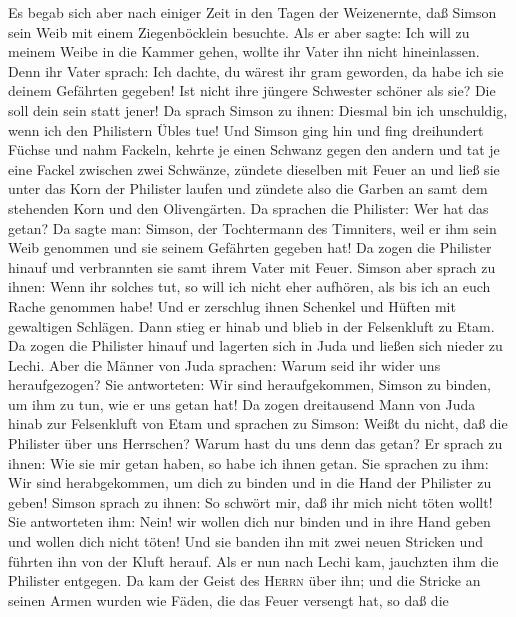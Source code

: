  Es begab sich aber nach einiger Zeit in den Tagen der
Weizenernte, daß Simson sein Weib mit einem Ziegenböcklein besuchte. Als
er aber sagte: Ich will zu meinem Weibe in die Kammer gehen, wollte ihr
Vater ihn nicht hineinlassen.  Denn ihr Vater sprach: Ich
dachte, du wärest ihr gram geworden, da habe ich sie deinem Gefährten
gegeben! Ist nicht ihre jüngere Schwester schöner als sie? Die soll dein
sein statt jener!  Da sprach Simson zu ihnen: Diesmal bin
ich unschuldig, wenn ich den Philistern Übles tue!  Und
Simson ging hin und fing dreihundert Füchse und nahm Fackeln, kehrte je
einen Schwanz gegen den andern und tat je eine Fackel zwischen zwei
Schwänze,  zündete dieselben mit Feuer an und ließ sie
unter das Korn der Philister laufen und zündete also die Garben an samt
dem stehenden Korn und den Olivengärten.  Da sprachen die
Philister: Wer hat das getan? Da sagte man: Simson, der Tochtermann des
Timniters, weil er ihm sein Weib genommen und sie seinem Gefährten
gegeben hat! Da zogen die Philister hinauf und verbrannten sie samt
ihrem Vater mit Feuer.  Simson aber sprach zu ihnen: Wenn
ihr solches tut, so will ich nicht eher aufhören, als bis ich an euch
Rache genommen habe!  Und er zerschlug ihnen Schenkel und
Hüften mit gewaltigen Schlägen. Dann stieg er hinab und blieb in der
Felsenkluft zu Etam.  Da zogen die Philister hinauf und
lagerten sich in Juda und ließen sich nieder zu Lechi. 
Aber die Männer von Juda sprachen: Warum seid ihr wider uns
heraufgezogen? Sie antworteten: Wir sind heraufgekommen, Simson zu
binden, um ihm zu tun, wie er uns getan hat!  Da zogen
dreitausend Mann von Juda hinab zur Felsenkluft von Etam und sprachen zu
Simson: Weißt du nicht, daß die Philister über uns Herrschen? Warum hast
du uns denn das getan? Er sprach zu ihnen: Wie sie mir getan haben, so
habe ich ihnen getan.  Sie sprachen zu ihm: Wir sind
herabgekommen, um dich zu binden und in die Hand der Philister zu geben!
Simson sprach zu ihnen: So schwört mir, daß ihr mich nicht töten wollt!
 Sie antworteten ihm: Nein! wir wollen dich nur binden
und in ihre Hand geben und wollen dich nicht töten! Und sie banden ihn
mit zwei neuen Stricken und führten ihn von der Kluft herauf.
 Als er nun nach Lechi kam, jauchzten ihm die Philister
entgegen. Da kam der Geist des \textsc{Herrn} über ihn; und die Stricke
an seinen Armen wurden wie Fäden, die das Feuer versengt hat, so daß die
